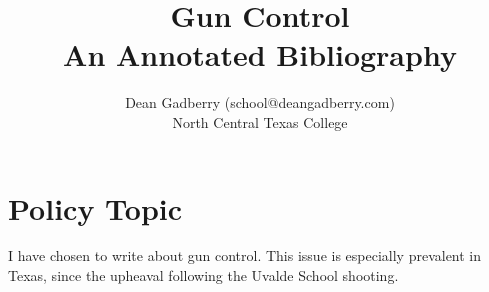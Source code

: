 \documentclass [11pt]{article}
\title{Gun Control\\\medskip An Annotated Bibliography}
\author{Dean Gadberry (school@deangadberry.com)\\North Central Texas College}
\begin{document}
\maketitle
\pagebreak
\section{Policy Topic}
I have chosen to write about gun control. This issue is especially prevalent in Texas, since the upheaval following the Uvalde School shooting.
\nocite{*}
\printbibliography
\end{document}
